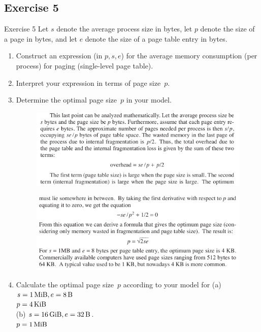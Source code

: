 \documentclass[10pt]{beamer}
\begin{document}
\subsection*{Exercise 5}
\frame{\subsectionpage}
\begin{frame}{Exercise 5}
	Let $s$ denote the average process size in bytes, 
	let $p$ denote the size of a page in bytes, 
	and let $e$ denote the size of a page table entry in bytes.
	
	\begin{enumerate}
		\item%
			Construct an expression (in $p,s,e$) for the average memory consumption (per process) for paging (single-level page table).
		\item%
			Interpret your expression in terms of page size~$p$.
		\item%
			Determine the optimal page size~$p$ in your model.
        \framebreak
        
    \begin{figure}
        \includegraphics[keepaspectratio, width=\textwidth, height=\textheight-2\baselineskip-2\baselineskip]{img/ex5_tanen.png} \\
    \end{figure}
     \begin{figure}
        \includegraphics[keepaspectratio, width=\textwidth, height=\textheight-2\baselineskip-2\baselineskip]{img/ex5_tanen_1.png} \\
    \end{figure}   
    \framebreak
		\item%
			Calculate the optimal page size~$p$ according to your model for 
			(a) $s = \SI{1}{\mebi\byte}, e = \SI{8}{\byte}$ \\
			\alert{$p = \SI{4}{\kibi\byte}$} \\ 
			(b) $s = \SI{16}{\gibi\byte}, e = \SI{32}{\byte}$. \\
			\alert{$p = \SI{1}{\mebi\byte}$}
	\end{enumerate}
\end{frame}
\end{document}
